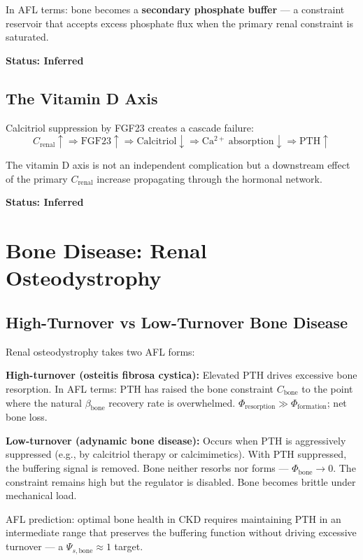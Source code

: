 \documentclass[12pt,a4paper]{article}
\begin{document}
In AFL terms: bone becomes a \textbf{secondary phosphate buffer} --- a constraint reservoir that accepts excess phosphate flux when the primary renal constraint is saturated.

\textbf{Status: Inferred}

\subsection{The Vitamin D Axis}

Calcitriol suppression by FGF23 creates a cascade failure:
\begin{equation}
    C_{\mathrm{renal}} \uparrow \Rightarrow \mathrm{FGF23} \uparrow \Rightarrow \mathrm{Calcitriol} \downarrow \Rightarrow \mathrm{Ca^{2+}\ absorption} \downarrow \Rightarrow \mathrm{PTH} \uparrow
\end{equation}

The vitamin D axis is not an independent complication but a downstream effect of the primary $C_{\mathrm{renal}}$ increase propagating through the hormonal network.

\textbf{Status: Inferred}

\section{Bone Disease: Renal Osteodystrophy}

\subsection{High-Turnover vs Low-Turnover Bone Disease}

Renal osteodystrophy takes two AFL forms:

\textbf{High-turnover (osteitis fibrosa cystica):} Elevated PTH drives excessive bone resorption. In AFL terms: PTH has raised the bone constraint $C_{\mathrm{bone}}$ to the point where the natural $\beta_{\mathrm{bone}}$ recovery rate is overwhelmed. $\Phi_{\mathrm{resorption}} \gg \Phi_{\mathrm{formation}}$; net bone loss.

\textbf{Low-turnover (adynamic bone disease):} Occurs when PTH is aggressively suppressed (e.g., by calcitriol therapy or calcimimetics). With PTH suppressed, the buffering signal is removed. Bone neither resorbs nor forms --- $\Phi_{\mathrm{bone}} \to 0$. The constraint remains high but the regulator is disabled. Bone becomes brittle under mechanical load.

AFL prediction: optimal bone health in CKD requires maintaining PTH in an intermediate range that preserves the buffering function without driving excessive turnover --- a $\Psi_{s,\mathrm{bone}} \approx 1$ target.
\end{document}
